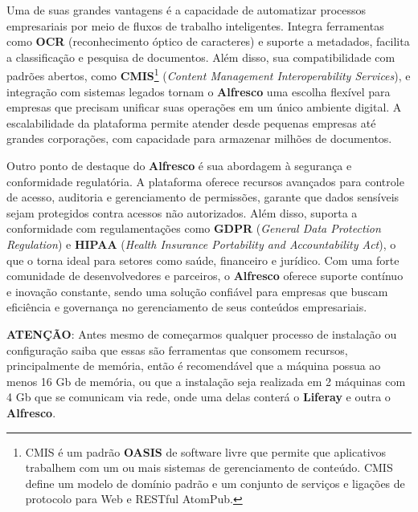 \documentclass[a4paper,11pt]{article}
\begin{document}
Uma de suas grandes vantagens é a capacidade de automatizar processos empresariais por meio de fluxos de trabalho inteligentes. Integra ferramentas como \textbf{OCR} (reconhecimento óptico de caracteres) e suporte a metadados, facilita a classificação e pesquisa de documentos. Além disso, sua compatibilidade com padrões abertos, como \textbf{CMIS}\footnote{CMIS é um padrão \textbf{OASIS} de software livre que permite que aplicativos trabalhem com um ou mais sistemas de gerenciamento de conteúdo. CMIS define um modelo de domínio padrão e um conjunto de serviços e ligações de protocolo para Web e RESTful AtomPub.} (\textit{Content Management Interoperability Services}), e integração com sistemas legados tornam o \textbf{Alfresco} uma escolha flexível para empresas que precisam unificar suas operações em um único ambiente digital. A escalabilidade da plataforma permite atender desde pequenas empresas até grandes corporações, com capacidade para armazenar milhões de documentos.

Outro ponto de destaque do \textbf{Alfresco} é sua abordagem à segurança e conformidade regulatória. A plataforma oferece recursos avançados para controle de acesso, auditoria e gerenciamento de permissões, garante que dados sensíveis sejam protegidos contra acessos não autorizados. Além disso, suporta a conformidade com regulamentações como \textbf{GDPR} (\textit{General Data Protection Regulation}) e \textbf{HIPAA} (\textit{Health Insurance Portability and Accountability Act}), o que o torna ideal para setores como saúde, financeiro e jurídico. Com uma forte comunidade de desenvolvedores e parceiros, o \textbf{Alfresco} oferece suporte contínuo e inovação constante, sendo uma solução confiável para empresas que buscam eficiência e governança no gerenciamento de seus conteúdos empresariais.

\textbf{ATENÇÃO}: Antes mesmo de começarmos qualquer processo de instalação ou configuração saiba que essas são ferramentas que consomem recursos, principalmente de memória, então é recomendável que a máquina possua ao menos 16 Gb de memória, ou que a instalação seja realizada em 2 máquinas com 4 Gb que se comunicam via rede, onde uma delas conterá o \textbf{Liferay} e outra o \textbf{Alfresco}.
\end{document}
